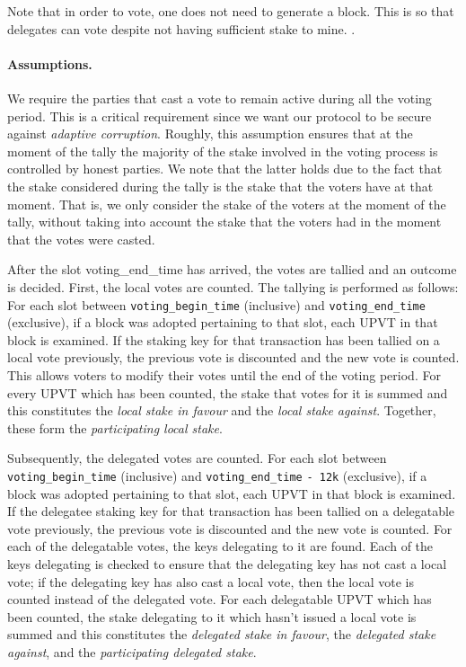 Note that in order to vote, one does not need to generate a block. This is so that delegates can vote despite not having sufficient stake to mine.
.
\paragraph{Assumptions.} We require the parties that cast a vote to remain active during all the voting
period. This is a critical requirement since we want our protocol to be secure against \emph{adaptive corruption}. Roughly, this assumption ensures that at the moment of the tally the majority
of the stake involved in the voting process is controlled by honest parties.
We note that the latter holds due to the fact that the stake considered during the tally is the stake 
that the voters have at that moment. That is, we only consider the stake of the voters at the moment of
the tally, without taking into account the stake that the voters had in the moment that the votes were casted.  



After the slot voting\_end\_time has arrived, the votes are tallied and an outcome is decided. First, the local votes are counted. The tallying is performed as follows: For each slot between \verb;voting_begin_time; (inclusive) and \verb;voting_end_time; (exclusive), if a block was adopted pertaining to that slot, each UPVT in that block is examined. If the staking key for that transaction has been tallied on a local vote previously, the previous vote is discounted and the new vote is counted. This allows voters to modify their votes until the end of the voting period. For every UPVT which has been counted, the stake that votes for it is summed and this constitutes the \emph{local stake in favour} and the \emph{local stake against}. Together, these form the \emph{participating local stake}.

Subsequently, the delegated votes are counted. For each slot between \verb;voting_begin_time; (inclusive) and \verb;voting_end_time; \verb;- 12k; (exclusive), if a block was adopted pertaining to that slot, each UPVT in that block is examined. If the delegatee staking key for that transaction has been tallied on a delegatable vote previously, the previous vote is discounted and the new vote is counted. For each of the delegatable votes, the keys delegating to it are found. Each of the keys delegating is checked to ensure that the delegating key has not cast a local vote; if the delegating key has also cast a local vote, then the local vote is counted instead of the delegated vote. For each delegatable UPVT which has been counted, the stake delegating to it which hasn't issued a local vote is summed and this constitutes the \emph{delegated stake in favour}, the \emph{delegated stake against}, and the \emph{participating delegated stake}.

